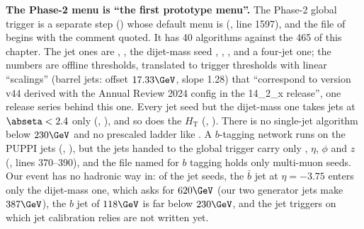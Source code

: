 \textbf{The Phase-2 menu is ``the first prototype menu''.} The Phase-2 global trigger is a separate 
step () whose default menu is 
(, line 1597), and the file  of
 begins with the comment quoted. It has 40 algorithms against the
465 of this chapter. The jet ones are , , the dijet-mass seed
, , ,  and a four-jet
one; the numbers are offline thresholds, translated to trigger thresholds with linear ``scalings'' (barrel jets: offset
$17.33\GeV$, slope 1.28) that ``correspond to version v44 derived with the Annual Review 2024 config in the 14\_2\_x
release'', one release series behind this one. Every jet seed but the dijet-mass one takes jets at $\abseta<2.4$ only
(, ), and so does the $H_{\mathrm T}$ (,
). There is no single-jet algorithm below $230\GeV$ and no prescaled ladder like
. A $b$-tagging network runs on the PUPPI jets
(, ), but the jets handed to the global trigger
carry only \pt, $\eta$, $\phi$ and $z$ (, lines 370--390), and the
file named for $b$ tagging holds only multi-muon seeds. Our event has no hadronic way in: of the jet seeds, the $\bar
b$ jet at $\eta=-3.75$ enters only the dijet-mass one, which asks for $620\GeV$ (our two generator jets make
$387\GeV$), the $b$ jet of $118\GeV$ is far below $230\GeV$, and the jet triggers on which jet calibration relies are
not written yet.

